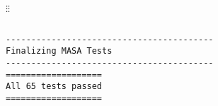 \documentclass[mathserif]{beamer}
\begin{document}
\begin{frame}[fragile]
\begin{columns}[c]
\begin{column}{4.2cm}
{\begin{verbatim}
\end{verbatim}
$\vdots$\hspace*{6em}$\vdots$
\begin{verbatim}

-----------------------------------------
Finalizing MASA Tests
-----------------------------------------
===================
All 65 tests passed
===================
\end{verbatim}
      }
    \end{column}
  \end{columns}

\end{frame}

\end{document}
